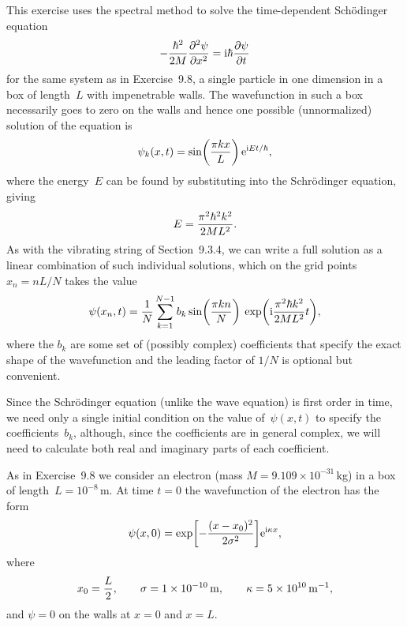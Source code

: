 \documentclass[12pt]{article}
\begin{document}
\begin{exercises}
\exskip This exercise uses the spectral method to solve the time-dependent
Sch\"odinger equation
\begin{displaymath}
-{\hbar^2\over2M} {\partial^2\psi\over\partial x^2}
  = \mathrm{i}\hbar {\partial\psi\over\partial t}
\end{displaymath}
for the same system as in Exercise~9.8, a single particle in one dimension
in a box of length~$L$ with impenetrable walls.  The wavefunction in such a
box necessarily goes to zero on the walls and hence one possible
(unnormalized) solution of the equation is
\begin{displaymath}
\psi_k(x,t) = \sin \biggl( {\pi k x\over L} \biggr)\,\mathrm{e}^{\mathrm{i} Et/\hbar},
\end{displaymath}
where the energy~$E$ can be found by substituting into the Schr\"odinger
equation, giving
\begin{displaymath}
E = {\pi^2\hbar^2k^2\over2ML^2}.
\end{displaymath}
As with the vibrating string of Section~9.3.4, we can write a full solution
as a linear combination of such individual solutions, which on the grid
points $x_n=nL/N$ takes the value
\begin{displaymath}
\psi(x_n,t) = {1\over N}
              \sum_{k=1}^{N-1} b_k \sin \biggl( {\pi k n\over N} \biggr)\>
              \exp \biggl( \mathrm{i}{\pi^2\hbar k^2\over2ML^2} t \biggr),
\end{displaymath}
where the $b_k$ are some set of (possibly complex) coefficients that
specify the exact shape of the wavefunction and the leading factor of $1/N$
is optional but convenient.

Since the Schr\"odinger equation (unlike the wave equation) is first order
in time, we need only a single initial condition on the value
of~$\psi(x,t)$ to specify the coefficients~$b_k$, although, since the
coefficients are in general complex, we will need to calculate both real
and imaginary parts of each coefficient.

As in Exercise~9.8 we consider an electron (mass
$M=9.109\times10^{-31}\,$kg) in a box of length~$L=10^{-8}\,$m.  At time
$t=0$ the wavefunction of the electron has the form
\begin{displaymath}
\psi(x,0) = \exp \biggl[ -{(x-x_0)^2\over2\sigma^2} \biggr]
            \mathrm{e}^{\mathrm{i}\kappa x},
\end{displaymath}
where
\begin{displaymath}
x_0 = {L\over2},\qquad
\sigma = 1\times10^{-10}\,\mathrm{m},\qquad
\kappa = 5\times10^{10}\,\mathrm{m}^{-1},
\end{displaymath}
and $\psi=0$ on the walls at $x=0$ and $x=L$.


\end{exercises}
\end{document}
